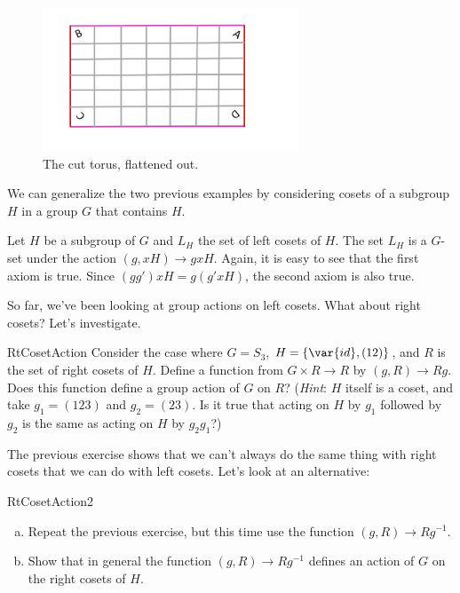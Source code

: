 \begin{figure}[ht]
\begin{center}
\includegraphics[width=3in]{images/Torus2.png}
\caption{The cut torus, flattened out.}\label{fig:Torus2}
\end{center}
\end{figure}

We can generalize the two previous examples by considering cosets of a subgroup $H$ in a group $G$ that contains $H$.

\begin{example}\label{example:actions:CosetAction}
Let $H$ be a subgroup of $G$ and $L_H$ the set of left cosets of $H$. The set $L_H$ is a $G$-set under the action 
$(g,xH)\rightarrow gxH$.
Again, it is easy to see that the ﬁrst axiom is true. Since $(gg')xH = g(g'xH)$, the second axiom is also true.
\end{example}
So far, we've been looking at group actions on left cosets.  What about right cosets?  Let's investigate.

\begin {exercise}{RtCosetAction}
Consider the case where $G=S_3$, $H=\{\var{id},(12)\}$, and $R$ is the set of right cosets of $H$.  Define a function from $G\times R\rightarrow R$ by $(g,R)\rightarrow Rg$. Does this function define a group action of $G$ on $R$? (\emph {Hint}: $H$ itself is a coset, and take $g_1=(123)$ and $g_2=(23)$.  Is it true that acting on $H$ by $g_1$ followed by $g_2$ is the same as acting on $H$ by $g_2 g_1$?)
\end {exercise}
The previous exercise shows that we can't always do the same thing with right cosets that we can do with left cosets.  Let's look at an alternative:  

\begin {exercise}{RtCosetAction2}
\begin{enumerate}[(a)]
\item Repeat the previous exercise, but this time use the function $(g,R)\rightarrow Rg^{-1}$.
\item Show that in general the function $(g,R)\rightarrow Rg^{-1}$ defines an action of $G$ on the right cosets of $H$.  
\end {enumerate}
\end {exercise}
